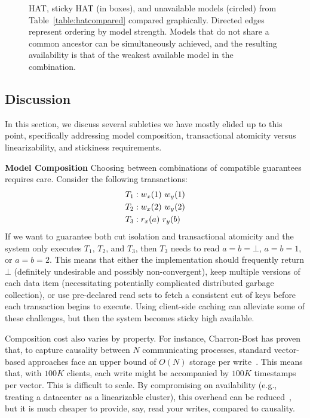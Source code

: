 \begin{figure}[t!]
\label{fig:hat-order}
\caption{HAT, sticky HAT (in boxes), and unavailable models (circled)
  from Table~\protect\ref{table:hatcompared} compared
  graphically. Directed edges represent ordering by model
  strength. Models that do not share a common ancestor can be
  simultaneously achieved, and the resulting availability is that of
  the weakest available model in the combination.}
\label{fig:hatcompared}
\end{figure}


\subsection{Discussion}
\label{sec:discussion}

In this section, we discuss several subleties we have mostly elided up
to this point, specifically addressing model composition,
transactional atomicity versus linearizability, and stickiness
requirements.

\vspace{.5em}\noindent\textbf{Model Composition} Choosing between
combinations of compatible guarantees requires care. Consider the
following transactions:
\begin{align*}
\small
T_1 &: w_x(1)~w_y(1)
\\T_2 &: w_x(2)~w_y(2)
\\T_3 &: r_x(a)~r_y(b)
\end{align*}
If we want to guarantee both cut isolation and transactional atomicity
and the system only executes $T_1$, $T_2$, and $T_3$, then $T_3$ needs
to read $a=b=\bot$, $a=b=1$, or $a=b=2$. This means that either the
implementation should frequently return $\bot$ (definitely undesirable
and possibly non-convergent), keep multiple versions of each data item
(necessitating potentially complicated distributed garbage
collection), or use pre-declared read sets to fetch a consistent cut
of keys before each transaction begins to execute. Using client-side
caching can alleviate some of these challenges, but then the system
becomes sticky high available.

Composition cost also varies by property. For instance, Charron-Bost
has proven that, to capture causality between $N$ communicating
processes, standard vector-based approaches face an upper bound of
$O(N)$ storage per write~\cite{charron-bost}. This means that, with
$100K$ clients, each write might be accompanied by $100K$
timestamps per vector. This is difficult to scale. By compromising on
availability (e.g., treating a datacenter as a linearizable cluster),
this overhead can be reduced~\cite{cops, eiger}, but it is much
cheaper to provide, say, read your writes, compared to causality.


